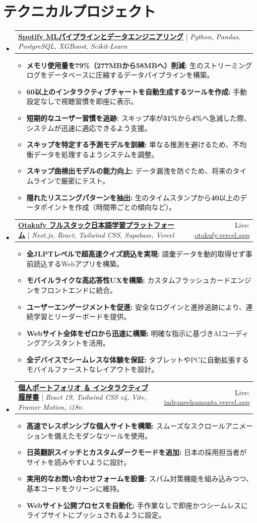 \documentclass[letterpaper,10pt]{article}
\makeatletter
\newcommand{\resumeItem}[1]{
  \item\small{#1}
}
\newcommand{\resumeProjectHeading}[2]{
    \item
    \begin{tabular*}{0.98\textwidth}[t]{l@{\extracolsep{\fill}}r}
      \small#1 & \small#2 \\
    \end{tabular*}\vspace{2pt}
}
\newcommand{\resumeSubHeadingListStart}{\begin{itemize}[leftmargin=0.12in, label={}, itemsep=5pt, parsep=0pt, topsep=2pt]}
\newcommand{\resumeSubHeadingListEnd}{\end{itemize}}
\newcommand{\resumeItemListStart}{\begin{itemize}[leftmargin=0.18in, itemsep=3pt, parsep=0pt, topsep=1pt, partopsep=0pt]}
\newcommand{\resumeItemListEnd}{\end{itemize}\vspace{1pt}}
\makeatother
\begin{document}
\section{テクニカルプロジェクト}
    \resumeSubHeadingListStart
      \resumeProjectHeading
          {\href{https://github.com/NotCatfish/Spotify-Analytics-Pipeline}{\textbf{Spotify MLパイプラインとデータエンジニアリング}} | \emph{Python, Pandas, PostgreSQL, XGBoost, Scikit-Learn}}{}
          \resumeItemListStart
            \resumeItem{\textbf{メモリ使用量を79\%（277MBから58MBへ）削減:} 生のストリーミングログをデータベースに圧縮するデータパイプラインを構築。}
            \resumeItem{\textbf{60以上のインタラクティブチャートを自動生成するツールを作成:} 手動設定なしで視聴習慣を即座に表示。}
            \resumeItem{\textbf{短期的なユーザー習慣を追跡:} スキップ率が\textbf{31\%}から\textbf{4\%}へ急減した際、システムが迅速に適応できるよう支援。}
            \resumeItem{\textbf{スキップを特定する予測モデルを訓練:} 単なる推測を避けるため、不均衡データを処理するようシステムを調整。}
            \resumeItem{\textbf{スキップ曲検出モデルの能力向上:} データ漏洩を防ぐため、将来のタイムラインで厳密にテスト。}
            \resumeItem{\textbf{隠れたリスニングパターンを抽出:} 生のタイムスタンプから\textbf{40}以上のデータポイントを作成（時間帯ごとの傾向など）。}
          \resumeItemListEnd

      \resumeProjectHeading
          {\href{https://github.com/NotCatfish/Otakufy}{\textbf{Otakufy フルスタック日本語学習プラットフォーム}} | \emph{Next.js, React, Tailwind CSS, Supabase, Vercel}}{Live: \href{https://otakufy.vercel.app/}{\underline{otakufy.vercel.app}}}
          \resumeItemListStart
            \resumeItem{\textbf{全JLPTレベルで超高速クイズ読込を実現:} 語彙データを動的取得せず事前読込するWebアプリを構築。}
            \resumeItem{\textbf{モバイルライクな高応答性UXを構築:} カスタムフラッシュカードエンジンをフロントエンドに統合。}
            \resumeItem{\textbf{ユーザーエンゲージメントを促進:} 安全なログインと進捗追跡により、連続学習とリーダーボードを提供。}
            \resumeItem{\textbf{Webサイト全体をゼロから迅速に構築:} 明確な指示に基づきAIコーディングアシスタントを活用。}
            \resumeItem{\textbf{全デバイスでシームレスな体験を保証:} タブレットやPCに自動拡張するモバイルファーストなレイアウトを設計。}
          \resumeItemListEnd

      \resumeProjectHeading
          {\href{https://github.com/NotCatfish/portfolio}{\textbf{個人ポートフォリオ ＆ インタラクティブ履歴書}} | \emph{React 19, Tailwind CSS v4, Vite, Framer Motion, i18n}}{Live: \href{https://indraneelsamanta.vercel.app/}{\underline{indraneelsamanta.vercel.app}}}
          \resumeItemListStart
            \resumeItem{\textbf{高速でレスポンシブな個人サイトを構築:} スムーズなスクロールアニメーションを備えたモダンなツールを使用。}
            \resumeItem{\textbf{日英翻訳スイッチとカスタムダークモードを追加:} 日本の採用担当者がサイトを読みやすいように設計。}
            \resumeItem{\textbf{実用的なお問い合わせフォームを設置:} スパム対策機能を組み込みつつ、基本コードをクリーンに維持。}
            \resumeItem{\textbf{Webサイト公開プロセスを自動化:} 手作業なしで即座かつシームレスにライブサイトにプッシュされるように設定。}
          \resumeItemListEnd
    \resumeSubHeadingListEnd
\end{document}
